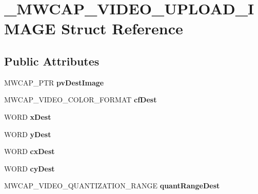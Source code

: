 \hypertarget{struct__MWCAP__VIDEO__UPLOAD__IMAGE}{\section{\-\_\-\-M\-W\-C\-A\-P\-\_\-\-V\-I\-D\-E\-O\-\_\-\-U\-P\-L\-O\-A\-D\-\_\-\-I\-M\-A\-G\-E Struct Reference}
\label{struct__MWCAP__VIDEO__UPLOAD__IMAGE}
}
\subsection*{Public Attributes}
\begin{DoxyCompactItemize}
\item 
\hypertarget{struct__MWCAP__VIDEO__UPLOAD__IMAGE_a24edd1479521bdad531292322823fb4a}{M\-W\-C\-A\-P\-\_\-\-P\-T\-R {\bfseries pv\-Dest\-Image}}\label{struct__MWCAP__VIDEO__UPLOAD__IMAGE_a24edd1479521bdad531292322823fb4a}

\item 
\hypertarget{struct__MWCAP__VIDEO__UPLOAD__IMAGE_a7632717db4274809f4865096e7d91965}{M\-W\-C\-A\-P\-\_\-\-V\-I\-D\-E\-O\-\_\-\-C\-O\-L\-O\-R\-\_\-\-F\-O\-R\-M\-A\-T {\bfseries cf\-Dest}}\label{struct__MWCAP__VIDEO__UPLOAD__IMAGE_a7632717db4274809f4865096e7d91965}

\item 
\hypertarget{struct__MWCAP__VIDEO__UPLOAD__IMAGE_aaccffcac727ca27497e95946d509e2bc}{W\-O\-R\-D {\bfseries x\-Dest}}\label{struct__MWCAP__VIDEO__UPLOAD__IMAGE_aaccffcac727ca27497e95946d509e2bc}

\item 
\hypertarget{struct__MWCAP__VIDEO__UPLOAD__IMAGE_a365aeaf4e99ccbdc4301e01f8c981396}{W\-O\-R\-D {\bfseries y\-Dest}}\label{struct__MWCAP__VIDEO__UPLOAD__IMAGE_a365aeaf4e99ccbdc4301e01f8c981396}

\item 
\hypertarget{struct__MWCAP__VIDEO__UPLOAD__IMAGE_a475ff8205a1417c95e02504275afa247}{W\-O\-R\-D {\bfseries cx\-Dest}}\label{struct__MWCAP__VIDEO__UPLOAD__IMAGE_a475ff8205a1417c95e02504275afa247}

\item 
\hypertarget{struct__MWCAP__VIDEO__UPLOAD__IMAGE_a068c42e25a37605238b46cee67c2c7ed}{W\-O\-R\-D {\bfseries cy\-Dest}}\label{struct__MWCAP__VIDEO__UPLOAD__IMAGE_a068c42e25a37605238b46cee67c2c7ed}

\item 
\hypertarget{struct__MWCAP__VIDEO__UPLOAD__IMAGE_a114beebdae290ae215a664e7f10b4c23}{M\-W\-C\-A\-P\-\_\-\-V\-I\-D\-E\-O\-\_\-\-Q\-U\-A\-N\-T\-I\-Z\-A\-T\-I\-O\-N\-\_\-\-R\-A\-N\-G\-E {\bfseries quant\-Range\-Dest}}\label{struct__MWCAP__VIDEO__UPLOAD__IMAGE_a114beebdae290ae215a664e7f10b4c23}


\end{DoxyCompactItemize}
